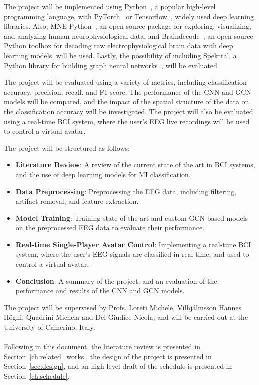 The project will be implemented using Python~\cite{10.5555/1593511}, a popular high-level programming language, with PyTorch~\cite{NEURIPS2019_9015} or Tensorflow~\cite{tensorflow2015-whitepaper}, widely used deep learning libraries.
Also, MNE-Python~\cite{larson_2024_10519948, 10.3389/fnins.2013.00267}, an open-source package for exploring, visualizing, and analyzing human neurophysiological data, and Braindecode~\cite{HBM:HBM23730}, an open-source Python toolbox for decoding raw electrophysiological brain data with deep learning models, will be used.
Lastly, the possibility of including Spektral, a Python library for building graph neural networks~\cite{grattarola2020graph}, will be evaluated.

The project will be evaluated using a variety of metrics, including classification accuracy, precision, recall, and F1 score.
The performance of the CNN and GCN models will be compared, and the impact of the spatial structure of the data on the classification accuracy will be investigated.
The project will also be evaluated using a real-time BCI system, where the user's EEG live recordings will be used to control a virtual avatar.

The project will be structured as follows:
\begin{itemize}
    \item \textbf{Literature Review}: A review of the current state of the art in BCI systems, and the use of deep learning models for MI classification.
    \item \textbf{Data Preprocessing}: Preprocessing the EEG data, including filtering, artifact removal, and feature extraction.
    \item \textbf{Model Training}: Training state-of-the-art and custom GCN-based models on the preprocessed EEG data to evaluate their performance.
    \item \textbf{Real-time Single-Player Avatar Control}: Implementing a real-time BCI system, where the user's EEG signals are classified in real time, and used to control a virtual avatar.
    \item \textbf{Conclusion}: A summary of the project, and an evaluation of the performance and results of the CNN and GCN models.
\end{itemize}

The project will be supervised by Profs. Loreti Michele, Vilhj\'almsson Hannes H\"ogni, Quadrini Michela and Del Giudice Nicola, and will be carried out at the University of Camerino, Italy.
\\\\

Following in this document, the literature review is presented in Section~\ref{ch:related_works}, the design of the project is presented in Section~\ref{sec:design}, and an high level draft of the schedule is presented in Section~\ref{ch:schedule}.
